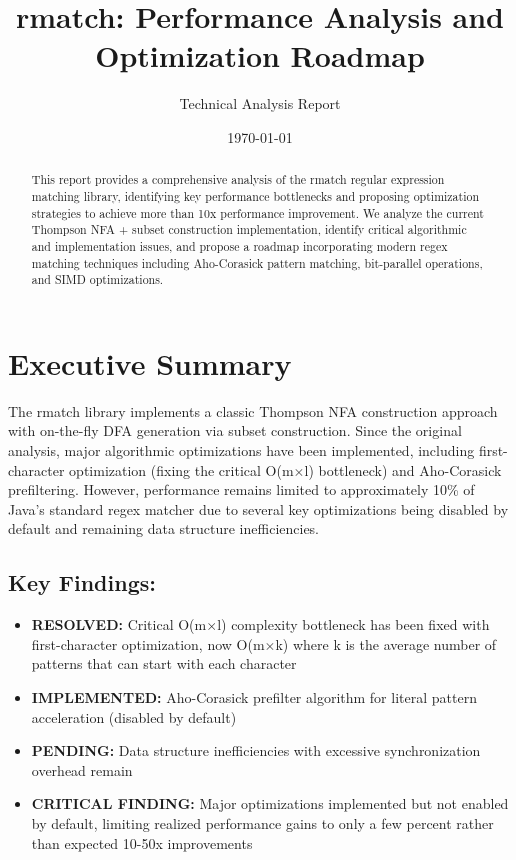 \documentclass[11pt,a4paper]{article}
\title{rmatch: Performance Analysis and Optimization Roadmap}
\author{Technical Analysis Report}
\date{\today}
\begin{document}
\maketitle

\begin{abstract}
This report provides a comprehensive analysis of the rmatch regular expression matching library, identifying key performance bottlenecks and proposing optimization strategies to achieve more than 10x performance improvement. We analyze the current Thompson NFA + subset construction implementation, identify critical algorithmic and implementation issues, and propose a roadmap incorporating modern regex matching techniques including Aho-Corasick pattern matching, bit-parallel operations, and SIMD optimizations.
\end{abstract}

\section{Executive Summary}

The rmatch library implements a classic Thompson NFA construction approach with on-the-fly DFA generation via subset construction. Since the original analysis, major algorithmic optimizations have been implemented, including first-character optimization (fixing the critical O(m$\times$l) bottleneck) and Aho-Corasick prefiltering. However, performance remains limited to approximately 10\% of Java's standard regex matcher due to several key optimizations being disabled by default and remaining data structure inefficiencies.

\subsection{Key Findings:}

\begin{itemize}
\item \textbf{RESOLVED:} Critical O(m$\times$l) complexity bottleneck has been fixed with first-character optimization, now O(m$\times$k) where k is the average number of patterns that can start with each character
\item \textbf{IMPLEMENTED:} Aho-Corasick prefilter algorithm for literal pattern acceleration (disabled by default)
\item \textbf{PENDING:} Data structure inefficiencies with excessive synchronization overhead remain
\item \textbf{CRITICAL FINDING:} Major optimizations implemented but not enabled by default, limiting realized performance gains to only a few percent rather than expected 10-50x improvements
\end{itemize}
\end{document}

